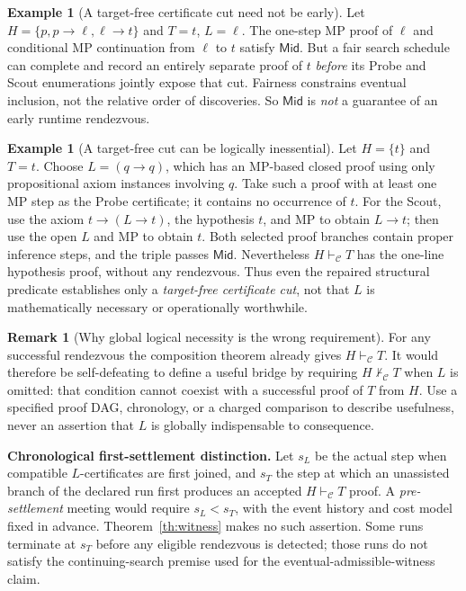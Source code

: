 \documentclass[11pt,letterpaper]{article}
\theoremstyle{definition}
\newtheorem{example}[theorem]{Example}
\newtheorem{remark}[theorem]{Remark}
\newcommand{\vdC}{\vdash_{\mathcal C}}
\newcommand{\nvdC}{\nvdash_{\mathcal C}}
\newcommand{\Mid}{\mathsf{Mid}}
\begin{document}
\begin{example}[A target-free certificate cut need not be early]\label{ex:notearly}
Let $H=\{p,p\to \ell,\ell\to t\}$ and $T=t$, $L=\ell$.
The one-step MP proof of $\ell$ and conditional MP continuation
from $\ell$ to $t$ satisfy $\Mid$. But a fair search schedule can
complete and record an entirely separate proof of $t$ \emph{before}
its Probe and Scout enumerations jointly expose that cut. Fairness
constrains eventual inclusion, not the relative order of discoveries.
So $\Mid$ is \emph{not} a guarantee of an early runtime rendezvous.
\end{example}

\begin{example}[A target-free cut can be logically inessential]\label{ex:inessential}
Let $H=\{t\}$ and $T=t$. Choose $L=(q\to q)$, which has an MP-based
closed proof using only propositional axiom instances involving $q$.
Take such a proof with at least one MP step as the Probe certificate;
it contains no occurrence of $t$. For the Scout, use the axiom
$t\to(L\to t)$, the hypothesis $t$, and MP to obtain $L\to t$;
then use the open $L$ and MP to obtain $t$. Both selected proof branches
contain proper inference steps, and the triple passes $\Mid$.
Nevertheless $H\vdC T$ has the one-line hypothesis proof, without any
rendezvous. Thus even the repaired structural predicate establishes
only a \emph{target-free certificate cut}, not that $L$ is mathematically
necessary or operationally worthwhile.
\end{example}

\begin{remark}[Why global logical necessity is the wrong requirement]
For any successful rendezvous the composition theorem already gives
$H\vdC T$. It would therefore be self-defeating to define a useful
bridge by requiring $H\nvdC T$ when $L$ is omitted: that condition
cannot coexist with a successful proof of $T$ from $H$. Use a specified
proof DAG, chronology, or a charged comparison to describe usefulness,
never an assertion that $L$ is globally indispensable to consequence.
\end{remark}

\begin{keybox}
\textbf{Chronological first-settlement distinction.} Let $s_L$ be the
actual step when compatible $L$-certificates are first joined, and
$s_T$ the step at which an unassisted branch of the declared run first
produces an accepted $H\vdC T$ proof. A \emph{pre-settlement} meeting
would require $s_L<s_T$, with the event history and cost model fixed
in advance. Theorem~\ref{th:witness} makes no such assertion. Some
runs terminate at $s_T$ before any eligible rendezvous is detected;
those runs do not satisfy the continuing-search premise used for the
eventual-admissible-witness claim.
\end{keybox}
\end{document}
